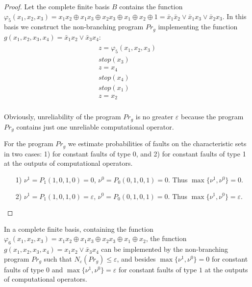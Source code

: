 \documentclass[
11pt,%
tightenlines,%
twoside,%
onecolumn,%
nofloats,%
nobibnotes,%
nofootinbib,%
superscriptaddress,%
noshowpacs,%
centertags]%
{revtex4}
\begin{document}
\begin{proof}
Let the complete finite basis $B$ contains the function $\varphi_5(x_1, x_2, x_3)=x_1 x_2\oplus x_1 x_3 \oplus x_2 x_3 \oplus x_1\oplus x_2 \oplus 1=\bar{x}_1\bar{x}_2\vee \bar{x}_1x_3\vee \bar{x}_2x_3$. In this basis we construct the non-branching program $Pr_g$ implementing the function $g(x_1, x_2, x_3, x_4)= \bar{x}_1 x_2 \vee \bar{x}_3 x_4$:
\begin{eqnarray*}
\begin{array}{l}
  z=\varphi_5(x_1, x_2, x_3)  \\
  stop(x_3) \\
  z=x_4  \\
  stop(x_4) \\
  stop(x_1) \\
  z=x_2 \\
\end{array}
\end{eqnarray*}

Obviously, unreliability of the program $Pr_g$ is no  greater
$\varepsilon$ because the program $Pr_g$ contains just one
unreliable computational operator.

For the program $Pr_g$ we estimate probabilities  of faults on the
characteristic sets in two cases: 1) for constant faults of type 0,
and 2) for constant faults of type 1 at the outputs of computational
operators.
\begin{itemize}
\item[1)] $\nu^1=P_1(1, 0, 1, 0)=0$,  $\nu^0=P_0(0, 1, 0, 1)=0$. Thus $\max\{\nu^1, \nu^0\}=0$.
\item[2)] $\nu^1=P_1(1, 0, 1, 0)=\varepsilon$,  $\nu^0=P_0(0, 1, 0, 1)=0$. Thus $\max\{\nu^1, \nu^0\}=\varepsilon$.
\end{itemize}

\end{proof}

\begin{lemma}\label{l7}
In a complete finite basis, containing the function $\varphi_6(x_1,
x_2, x_3)=x_1 x_2\oplus x_1 x_3 \oplus x_2 x_3 \oplus x_1\oplus
x_2$, the function $g(x_1, x_2, x_3, x_4)= x_1x_2 \vee \bar{x}_3
x_4$  can be implemented by the non-branching program $Pr_g$ such
that $N_\varepsilon(Pr_g)\leq \varepsilon$, and besides
$\max\{\nu^1, \nu^0\}=0$ for constant faults of type $0$ and
$\max\{\nu^1, \nu^0\}=\varepsilon$ for constant faults of type $1$
at the outputs of computational operators.
\end{lemma}
\end{document}
